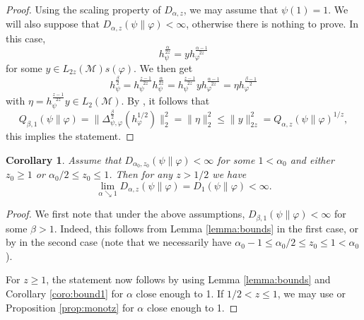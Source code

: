 \documentclass[12pt]{article}
\newtheorem{coro}{Corollary}
\theoremstyle{definition}
\theoremstyle{remark}
\def\Me{\mathcal M}
\begin{document}
\begin{proof} Using the scaling property of $D_{\alpha,z}$, we may assume that
$\psi(1)=1$.
We will also suppose that $D_{\alpha,z}(\psi\|\varphi)<\infty$, otherwise there is nothing to prove.  In this case, 
\[h_\psi^{\frac{\alpha}{2z}}=yh_\varphi^{\frac{\alpha-1}{2z}}
\]
for some $y\in L_{2z}(\Me)s(\varphi)$. We then get
\[
h_\psi^{\frac{\beta}2}=h_\psi^{\frac{z-1}{2z}}h_\psi^{\frac{\alpha}{2z}}=h_\psi^{\frac{z-1}{2z}}yh_\varphi^{\frac{\alpha-1}{2z}}=\eta h_{\varphi}^{\frac{\beta-1}2}
\]
with $\eta=h_\psi^{\frac{z-1}{2z}}y\in L_2(\Me)$. By \cite[Thm. 3.6]{hiai2021quantum},
it follows that
\[
Q_{\beta,1}(\psi\|\varphi)=\|\Delta_{\psi,\varphi}^{\frac{\beta}2}(h_\varphi^{1/2})\|_2^2=\|\eta\|_2^2\le
\|y\|_{2z}^2=Q_{\alpha,z}(\psi\|\varphi)^{1/z},
\]
this implies the statement.

\end{proof}



\begin{coro}\label{coro:limit}
Assume that  $D_{\alpha_0,z_0}(\psi\|\varphi)<\infty$ for some $1<\alpha_0$ and either
$z_0\ge 1$ or $\alpha_0/2\le z_0\le 1$. 
Then for any $z>1/2$ we have 
\[
\lim_{\alpha\searrow 1} D_{\alpha,z}(\psi\|\varphi)=D_1(\psi\|\varphi)<\infty.
\]

\end{coro}

\begin{proof}
We  first note  that under the above assumptions,
$D_{\beta,1}(\psi\|\varphi)<\infty$ for some $\beta>1$. Indeed, this follows from Lemma
\ref{lemma:bounds} in the first case, or by \cite[Prop. 2.3]{FHnote3} in the second case
(note that we necessarily have $\alpha_0-1\le \alpha_0/2\le z_0\le 1<\alpha_0$).

For $z\ge 1$, the statement now follows by using Lemma \ref{lemma:bounds} and Corollary
\ref{coro:bound1} for  $\alpha$ close
enough to 1. If $1/2<z\le 1$, we may use \cite[Prop. 2.3]{FHnote3} or Proposition
\ref{prop:monotz} for $\alpha$ close
enough to 1.


\end{proof}
\end{document}
